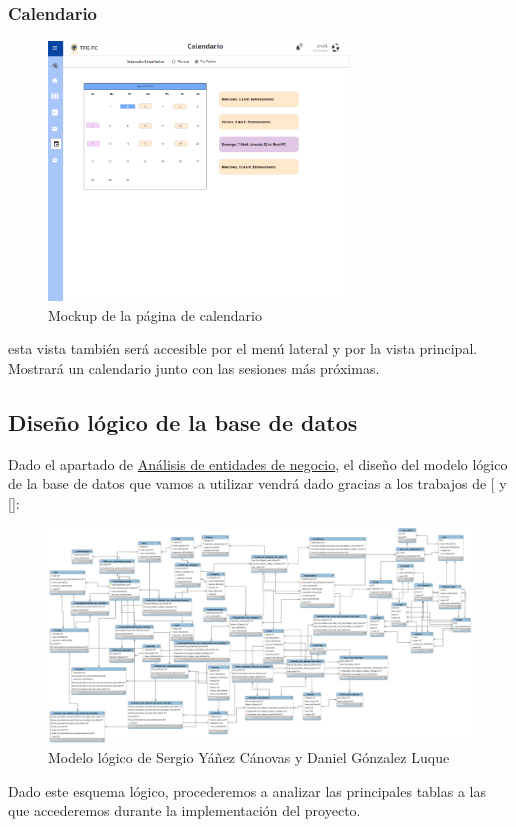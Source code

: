 \subsubsection{Calendario}
\begin{figure}[H] 
    \centering
    \includegraphics[width=8cm]{archivos/tfg_jorge/mockups/calendario}
    \caption{Mockup de la página de calendario}\label{sistemass2}
\end{figure}
esta vista también será accesible por el menú lateral y por la vista principal. Mostrará un calendario junto con las sesiones más próximas.
\subsection{Diseño lógico de la base de datos}
Dado el apartado de \hyperref[subsec:ent_nego_analysis]{Análisis de entidades de negocio}, el diseño del modelo lógico de la base de datos que vamos a utilizar vendrá dado gracias a los trabajos de [\cite{TFG_Daniel} y [\cite{TFG_Sergio}]:
\begin{figure}[H]
    \centering
    \includegraphics[width=15cm]{archivos/tfg_jorge/logical_design_bbdd}
    \caption{Modelo lógico de Sergio Yáñez Cánovas y Daniel Gónzalez Luque}\label{sistemass2}
\end{figure}
Dado este esquema lógico, procederemos a analizar las principales tablas a las que accederemos durante la implementación del proyecto.
